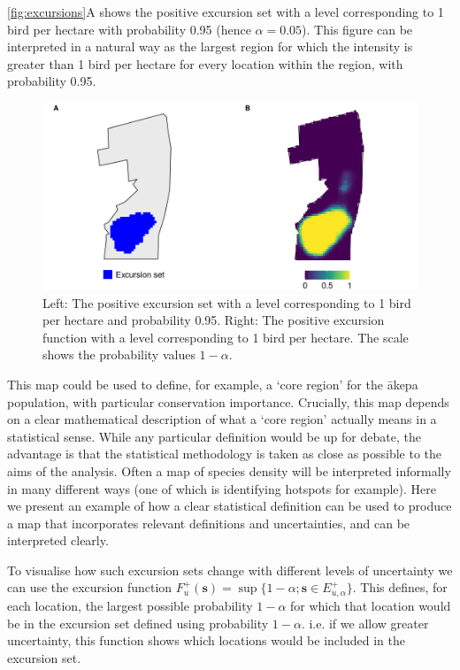 \documentclass{stylefile16/statsoc}
\newcommand{\bs}{\mathbf{s}}
\newcommand{\akepa}{\textquotesingle\={a}kepa}  %
\begin{document}
\autoref{fig:excursions}A shows the positive excursion set with a level corresponding to 1 bird per hectare with probability 0.95 (hence $\alpha = 0.05$).  This figure can be interpreted in a natural way as the largest region for which the intensity is greater than 1 bird per hectare for every location within the region, with probability 0.95. 
\begin{figure}[!htb]
	\includegraphics[scale=0.5]{figures/excursions.png}
	\caption{Left:  The positive excursion set with a level corresponding to 1 bird per hectare and probability 0.95.  Right: The positive excursion function with a level corresponding to 1 bird per hectare.  The scale shows the probability values $1-\alpha$.}
	\label{fig:excursions}
\end{figure} 
This map could be used to define, for example, a `core region' for the \akepa{} population, with particular conservation importance.  Crucially, this map depends on a clear mathematical description of what a `core region' actually means in a statistical sense.  While any particular definition would be up for debate, the advantage is that the statistical methodology is taken as close as possible to the aims of the analysis.  Often a map of species density will be interpreted informally in many different ways (one of which is identifying hotspots for example).  Here we present an example of how a clear statistical definition can be used to produce a map that incorporates relevant definitions and uncertainties, and can be interpreted clearly.  

To visualise how such excursion sets change with different levels of uncertainty we can use the excursion function $F_u^{+}(\bs) = \sup \{1 - \alpha ; \bs \in E_{u,\alpha}^+ \}$.  This defines, for each location, the largest possible probability $1 -\alpha$ for which that location would be in the excursion set defined using probability $1 - \alpha$.  i.e.  if we allow greater uncertainty, this function shows which locations would be included in the excursion set.    
\end{document}
